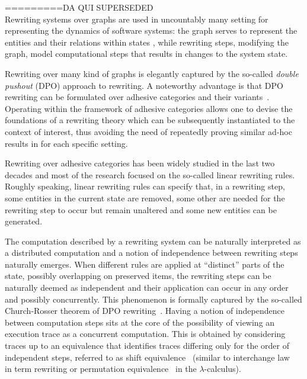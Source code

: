 \documentclass[a4paper,UKenglish,cleveref,pdftex, thm-restate,numberwithinsect]{lipics}
\begin{document}
=========DA QUI SUPERSEDED\\
Rewriting systems over graphs are used in uncountably many setting for
representing the dynamics of software systems: the graph serves to represent
the entities and their relations within states , while rewriting steps,
modifying the graph, model computational steps that results in
changes to the system state.

Rewriting over many kind of graphs is elegantly captured by the
so-called \emph{double pushout} (DPO) approach to rewriting. A
noteworthy advantage is that DPO rewriting can be formulated over
adhesive categories and their
variants~\cite{lack2005adhesive,ehrig2006weak}. Operating within the
framework of adhesive categories allows one to devise the foundations
of a rewriting theory which can be subsequently instantiated to the
context of interest, thus avoiding the need of repeatedly proving
similar ad-hoc results in for each specific setting.

Rewriting over adhesive categories has been widely studied in the last
two decades and most of the research focused on the so-called linear
rewriting rules. Roughly speaking, linear rewriting rules can specify
that, in a rewriting step, some entities in the current state are
removed, some other are needed for the rewriting step to occur but
remain unaltered and some new entities can be generated.

The computation described by a rewriting system can be naturally
interpreted as a distributed computation and a notion of independence
between rewriting steps naturally emerges. When different rules are
applied at ``distinct'' parts of the state, possibly overlapping on
preserved items, the rewriting steps can be naturally deemed as
independent and their application can occur in any order and possibly
concurrently. This phenomenon is formally captured by the so-called
Church-Rosser theorem of DPO rewriting~\cite{CMREHL:AAGT}.
%
Having a notion of independence between computation steps sits at the
core of the possibility of viewing an execution trace as a concurrent
computation. This is obtained by considering traces up to an
equivalence that identifies traces differing only for the order of
independent steps, referred to as shift equivalence~\cite{CMREHL:AAGT}
(similar to interchange law~\cite{Mes92} in term rewriting or
permutation equivalence~\cite{JJL80} in the $\lambda$-calculus).
\end{document}
